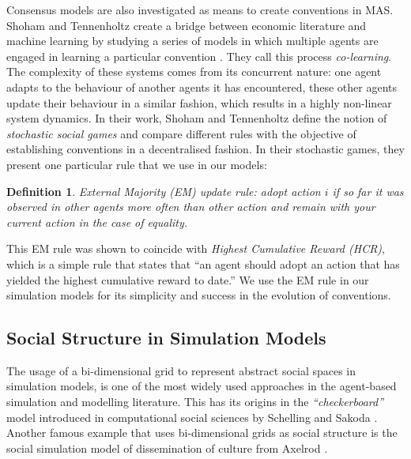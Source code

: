 \documentclass[preprint,number]{elsarticle}
\newtheorem{mydef}{Definition}
\begin{document}
	Consensus models are also investigated as means to create conventions in MAS. Shoham and
        Tennenholtz create a bridge between economic literature and machine learning by studying a
        series of models in which multiple agents are engaged in learning a particular convention
        \cite{Shoham1994}. They call this process \textit{co-learning}. The complexity of these
        systems comes from its concurrent nature: one agent adapts to the behaviour of another
        agents it has encountered, these other agents update their behaviour in a similar fashion,
        which results in a highly non-linear system dynamics. In their work, Shoham and Tennenholtz
        define the notion of \textit{stochastic social games} and compare different rules with the
        objective of establishing conventions in a decentralised fashion. In their stochastic games,
        they present one particular rule that we use in our models:
	
	\begin{mydef}
		\label{def:external-majority}
		\textit{External Majority (EM)} update rule: adopt action $i$ if so far it was
                observed in other agents more often than other action and remain with your current
                action in the case of equality.
	\end{mydef}
	
	This EM rule was shown to coincide with \textit{Highest Cumulative Reward (HCR)}, which is a
        simple rule that states that ``an agent should adopt an action that has yielded the highest
        cumulative reward to date.'' We use the EM rule in our simulation models for its simplicity
        and success in the evolution of conventions.
	
	\subsection{Social Structure in Simulation Models}
        \noindent The usage of a bi-dimensional grid to represent abstract social spaces in
        simulation models, is one of the most widely used approaches in the agent-based simulation
        and modelling literature. This has its origins in the \textit{``checkerboard''} model
        introduced in computational social sciences by Schelling and Sakoda
        \cite{Schelling1971,Sakoda1971}. Another famous example that uses bi-dimensional grids as
        social structure is the social simulation model of dissemination of culture from Axelrod
        \cite{Axelrod1997}.
	
\end{document}
